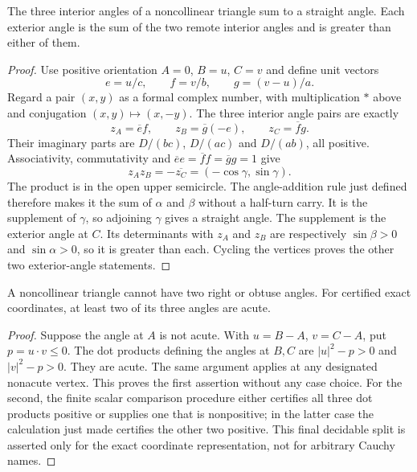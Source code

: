\begin{theorem}
\label{tri:angle-sum}
The three interior angles of a noncollinear triangle sum to a straight
angle.  Each exterior angle is the sum of the two remote interior angles
and is greater than either of them.
\end{theorem}
\begin{proof}
Use positive orientation $A=0$, $B=u$, $C=v$ and define unit vectors
\[
 e=u/c,\qquad f=v/b,\qquad g=(v-u)/a.
\]
Regard a pair $(x,y)$ as a formal complex number, with multiplication $*$
above and conjugation $(x,y)\mapsto(x,-y)$.  The three interior angle pairs
are exactly
\[
 z_A=\overline e f,\qquad z_B=\overline g(-e),\qquad
 z_C=\overline f g.
\]
Their imaginary parts are $D/(bc)$, $D/(ac)$ and $D/(ab)$, all positive.
Associativity, commutativity and $\overline e e=\overline f f=
\overline g g=1$ give
\[
 z_Az_B=-\overline{z_C}=(-\cos\gamma,\sin\gamma).
\]
The product is in the open upper semicircle.  The angle-addition rule just
defined therefore makes it the sum of $\alpha$ and $\beta$ without a
half-turn carry.  It is the supplement of $\gamma$, so adjoining
$\gamma$ gives a straight angle.  The supplement is the exterior angle at
$C$.  Its determinants with $z_A$ and $z_B$ are respectively
$\sin\beta>0$ and $\sin\alpha>0$, so it is greater than each.  Cycling the
vertices proves the other two exterior-angle statements.
\end{proof}

\begin{theorem}
\label{tri:acute}
A noncollinear triangle cannot have two right or obtuse angles.
For certified exact coordinates, at least two of its three angles are acute.
\end{theorem}
\begin{proof}
Suppose the angle at $A$ is not acute.  With $u=B-A$, $v=C-A$, put
$p=u\mathbin{\cdot}v\le0$.  The dot products defining the angles at $B,C$
are $|u|^2-p>0$ and $|v|^2-p>0$.  They are acute.  The same argument applies
at any designated nonacute vertex.  This proves the first assertion
without any case choice.  For the second, the finite scalar comparison
procedure either certifies all three dot products positive or supplies one
that is nonpositive; in the latter case the calculation just made certifies
the other two positive.  This final decidable split is asserted only for the
exact coordinate representation, not for arbitrary Cauchy names.
\end{proof}


